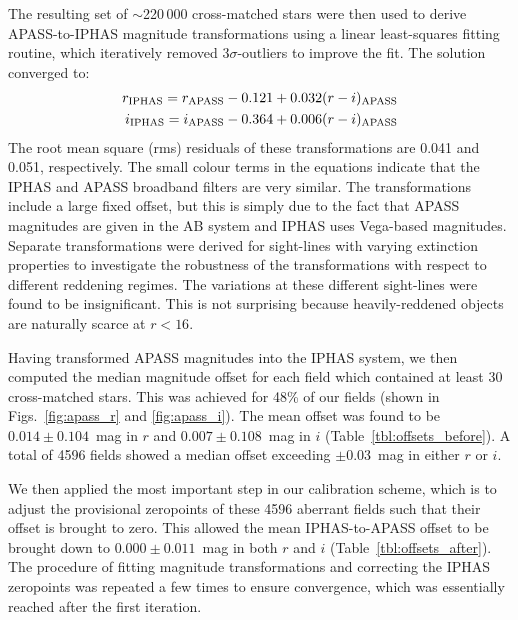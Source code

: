 \documentclass[useAMS,usenatbib]{mn2e}
\begin{document}
The resulting set of $\sim$220\,000 cross-matched stars were then used 
to derive APASS-to-IPHAS magnitude transformations
using a linear least-squares fitting routine, 
which iteratively removed $3\sigma$-outliers to improve the fit.
The solution converged to:
\begin{align} 
r_{\rm IPHAS} = r_{\rm APASS} - 0.121 + 0.032(r-i)_{\rm APASS} \label{eqn:apass_r} \\
i_{\rm IPHAS} = i_{\rm APASS} - 0.364 + 0.006(r-i)_{\rm APASS} \label{eqn:apass_i}
\end{align}
The root mean square (rms) residuals of these transformations 
are 0.041 and 0.051, respectively.
The small colour terms in the equations
indicate that the IPHAS and APASS broadband filters 
are very similar.
The transformations include a large fixed offset,
but this is simply due to the fact that 
APASS magnitudes are given in the AB system
and IPHAS uses Vega-based magnitudes.
Separate transformations were derived for sight-lines 
with varying extinction properties to investigate the robustness
of the transformations with respect to different reddening regimes.
The variations at these different
sight-lines were found to be insignificant.
This is not surprising because heavily-reddened objects 
are naturally scarce at $r<16$.

Having transformed APASS magnitudes into the IPHAS system,
we then computed the median magnitude offset 
for each field which contained at least 30 cross-matched stars.
This was achieved for 48\% of our fields (shown in Figs.~\ref{fig:apass_r} and \ref{fig:apass_i}).
The mean offset was found to be
$0.014\pm0.104$~mag in $r$ and $0.007\pm0.108$~mag in $i$
(Table~\ref{tbl:offsets_before}).
A total of 4596 fields showed a median offset
exceeding $\pm$0.03~mag in either $r$ or $i$.

We then applied the most important step in our calibration scheme,
which is to adjust the provisional zeropoints of these 4596 aberrant fields
such that their offset is brought to zero.
This allowed the mean IPHAS-to-APASS offset 
to be brought down to $0.000\pm0.011$~mag in both $r$ and $i$
(Table~\ref{tbl:offsets_after}).
The procedure of fitting magnitude transformations and
correcting the IPHAS zeropoints was repeated a few times to ensure 
convergence, which was essentially reached after the first iteration.
\end{document}
